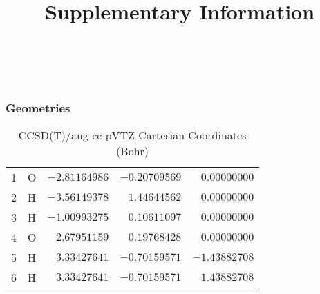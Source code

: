 \documentclass[10pt,oneside]{article}
\title{Supplementary Information}
\author{}
\date{}
\begin{document}
\maketitle

\tableofcontents

\newpage

\subsection{\ \ \ }

\subsubsection*{Geometries}
\begin{table}[h!]
\centering
\caption{CCSD(T)/aug-cc-pVTZ Cartesian Coordinates (Bohr)}
\begin{tabular}{llrrr}
1  & O  & $-2.81164986$ & $-0.20709569$ & $ 0.00000000$ \\
2  & H  & $-3.56149378$ & $ 1.44644562$ & $ 0.00000000$ \\
3  & H  & $-1.00993275$ & $ 0.10611097$ & $ 0.00000000$ \\
4  & O  & $ 2.67951159$ & $ 0.19768428$ & $ 0.00000000$ \\
5  & H  & $ 3.33427641$ & $-0.70159571$ & $-1.43882708$ \\
6  & H  & $ 3.33427641$ & $-0.70159571$ & $ 1.43882708$ \\
\end{tabular}
\end{table}

\clearpage
\end{document}
